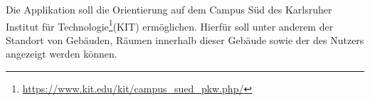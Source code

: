 
Die Applikation soll die Orientierung auf dem Campus Süd des Karlsruher Institut für Technologie\footnote{\href{https://www.kit.edu/kit/campus_sued_pkw.php/}{https://www.kit.edu/kit/campus\_sued\_pkw.php/}}(\Gls{KIT})
 ermöglichen. Hierfür soll unter anderem der Standort von Gebäuden, Räumen innerhalb dieser Gebäude sowie der
 des Nutzers angezeigt werden können.
 